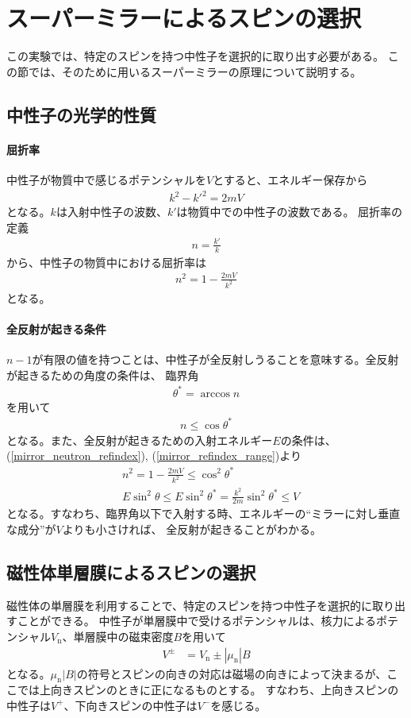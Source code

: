 \section{スーパーミラーによるスピンの選択}
\nocite{neutron_spin_optics}
この実験では、特定のスピンを持つ中性子を選択的に取り出す必要がある。
この節では、そのために用いるスーパーミラーの原理について説明する。

\subsection{中性子の光学的性質}
\paragraph{屈折率}
中性子が物質中で感じるポテンシャルを$V$とすると、エネルギー保存から
\begin{align}
k^2-k'^2=2mV
\end{align}
となる。$k$は入射中性子の波数、$k'$は物質中での中性子の波数である。
屈折率の定義
\begin{align}
n=\frac{k'}{k}
\end{align}
から、中性子の物質中における屈折率は
\begin{align}
n^2=1-\frac{2mV}{k^2}\label{mirror_neutron_refindex}
\end{align}
となる。

\paragraph{全反射が起きる条件}\label{mirrir_perfect_reflection}
$n-1$が有限の値を持つことは、中性子が全反射しうることを意味する。全反射が起きるための角度の条件は、
臨界角
\begin{align}
\theta^*=\arccos{n}
\end{align}
を用いて
\begin{align}
n\leq\cos\theta^* \label{mirror_refindex_range}
\end{align}
となる。また、全反射が起きるための入射エネルギー$E$の条件は、(\ref{mirror_neutron_refindex}), (\ref{mirror_refindex_range})より
\begin{align}
&n^2=1-\frac{2mV}{k^2}\leq\cos^2\theta^*\\
&E\sin^2\theta\leq E\sin^2\theta^*=\frac{k^2}{2m}\sin^2\theta^*\leq V
\end{align}
となる。すなわち、臨界角以下で入射する時、エネルギーの``ミラーに対し垂直な成分''が$V$よりも小さければ、
全反射が起きることがわかる。

\subsection{磁性体単層膜によるスピンの選択}
磁性体の単層膜を利用することで、特定のスピンを持つ中性子を選択的に取り出すことができる。
中性子が単層膜中で受けるポテンシャルは、核力によるポテンシャル$V_\mathrm{n}$、単層膜中の磁束密度$B$を用いて
\begin{align}
V^{\pm}&=V_\mathrm{n}\pm|\mu_\mathrm{n}|B
\end{align}
となる。$\mu_\mathrm{n}|B|$の符号とスピンの向きの対応は磁場の向きによって決まるが、ここでは上向きスピンのときに正になるものとする。
すなわち、上向きスピンの中性子は$V^+$、下向きスピンの中性子は$V^-$を感じる。

